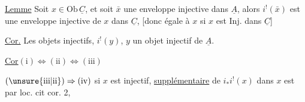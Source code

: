 

\uline{Lemme} Soit $x\in\mathrm{Ob}\,\underline C$, et soit $\bar x$ une enveloppe injective dans $\underline A$, alors $i^!(\bar x)$ est une enveloppe injective de $x$ dans $\underline C$, [donc égale à $x$ si $x$ est Inj. dans $\underline C$]

\uline{Cor.} Les objets injectifs,    $i^!(y)$, $y$ un objet injectif de $\underline A$.

\uline{Cor}\quad $(\mathrm i)\Longleftrightarrow(\mathrm{ii})\Longleftrightarrow(\mathrm{iii})$


$(\unsure{\mathrm{iii}|\mathrm{ii}})\Rightarrow(\mathrm{iv})$  si $x$ est injectif,  \uline{supplémentaire} de $i_*i^!(x)$ dans $x$ est    par loc. cit cor. 2,


